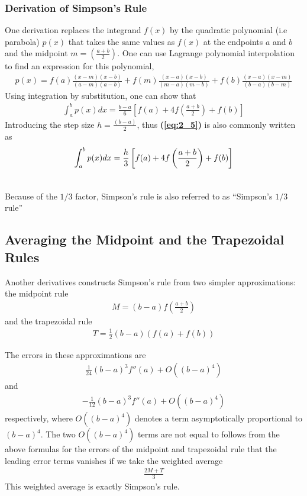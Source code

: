 \documentclass[12pt]{report}
\newcommand{\refn}[1]{\textbf{(\ref{#1})}}
\newcommand{\refx}[1]{\refn{eq:#1}}
\newcommand{\dsp}{\displaystyle}
\newcommand{\NI}{\noindent}
\begin{document}
	\subsubsection{Derivation of Simpson's Rule}
	One derivation replaces the integrand $f(x)$ by the quadratic polynomial (i.e parabola) $p(x)$ that takes the same values as $f(x)$ at the endpoints $a$ and $b$ and the midpoint $\dsp m = \left(\frac{a+b}{2}\right)$. One can use Lagrange polynomial interpolation to find an expression for this polynomial,
	\begin{eqnarray*}
		p(x) = f(a) \frac{(x-m) (x-b)}{(a-m) (a-b)} + f(m) \frac{(x-a)(x-b)}{(m-a) (m-b)} + f(b)\frac{(x-a)(x-m)}{(b-a) (b-m)}
	\end{eqnarray*}	
	Using integration by substitution, one can show that 
	\begin{eqnarray}
		\int_a^b p(x) dx = \frac{b-a}{6}\left[f(a)+ 4f\left(\frac{a+b}{2}\right) + f(b) \right]  \label{eq:2_5}
	\end{eqnarray}
	Introducing the step size $\dsp h = \frac{(b-a)}{2}$, thus \refx{2_5} is also commonly written as
	\begin{eqnarray}
			\int_a^b p(x) dx = \frac{h}{3}\left[f(a)+ 4f\left(\frac{a+b}{2}\right) + f(b) \right]\\\notag
	\end{eqnarray}
	
	\NI Because of the $1/3$ factor, Simpson's rule is also referred to as ``Simpson's $1/3$ rule''
	
	\subsection{Averaging the Midpoint and the Trapezoidal Rules}
	Another derivatives constructs Simpson's rule from two simpler approximations: the midpoint rule
	\begin{eqnarray}
		M = (b-a) f\left(\frac{a+b}{2}\right)
	\end{eqnarray}
	and the trapezoidal rule
	\begin{eqnarray}
		T = \frac{1}{2}(b-a) (f(a) + f(b))
	\end{eqnarray}
	
	\NI The errors in these approximations are 
	\begin{eqnarray*}
		\frac{1}{24}(b-a)^3 f''(a) + O((b-a)^4)
	\end{eqnarray*}
	and 
	\begin{eqnarray*}
		-\frac{1}{12}(b-a)^3 f''(a) + O((b-a)^4)
	\end{eqnarray*}
	respectively, where $O((b-a)^4)$ denotes a term asymptotically proportional to $(b-a)^4$. The two $O((b-a)^4)$ terms are not equal to follows from the above formulas for the errors of the midpoint and trapezoidal rule that the leading error terms vanishes if we take the weighted average
	\begin{eqnarray*}
		\frac{2M + T}{3}
	\end{eqnarray*}
	This weighted average is exactly Simpson's rule.
	
\end{document}
